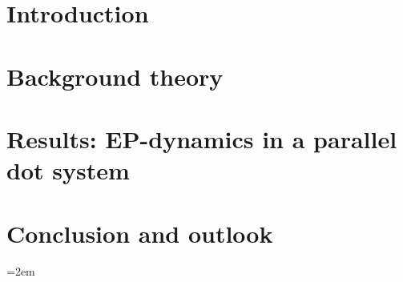 \documentclass[12pt, twoside]{report}
\begin{document}

\newpage
{}

\newpage
{
    \hypersetup{linkcolor=black}
    \tableofcontents
}
\newpage
{}
\chapter{Introduction}

\chapter{Background theory}\label{sec:theory}

\chapter{Results: EP-dynamics in a parallel dot system}\label{sec:dyn}


\chapter{Conclusion and outlook}\label{sec:conc}


\newpage
\emergencystretch=2em
\printbibliography
\end{document}
